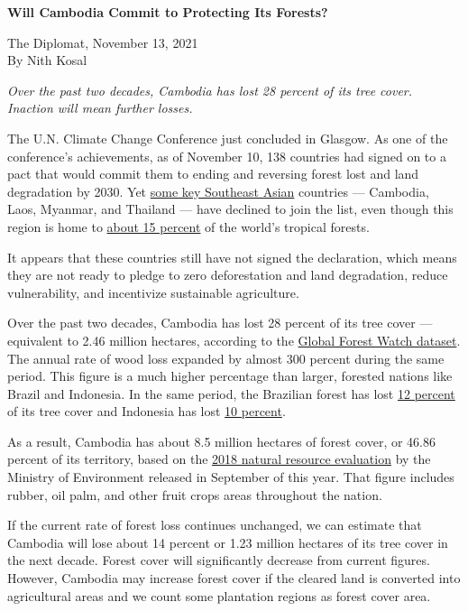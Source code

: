 \documentclass[10pt,a4paper]{letter}
\begin{document}
	
{\Large 
	\textbf{Will Cambodia Commit to Protecting Its Forests?}
} 

The Diplomat, November 13, 2021 \\
By Nith Kosal

\textit{Over the past two decades, Cambodia has lost 28 percent of its tree cover. Inaction will mean further losses. 
}

The U.N. Climate Change Conference just concluded in Glasgow. As one of the conference's achievements, as of November 10, 138 countries had signed on to a pact that would commit them to ending and reversing forest lost and land degradation by 2030. Yet \href{https://ukcop26.org/glasgow-leaders-declaration-on-forests-and-land-use/}{some key Southeast Asian} countries --- Cambodia, Laos, Myanmar, and Thailand --- have declined to join the list, even though this region is home to \href{https://bg.copernicus.org/articles/11/247/2014/bg-11-247-2014.pdf}{about 15 percent} of the world's tropical forests. 

It appears that these countries still have not signed the declaration, which means they are not ready to pledge to zero deforestation and land degradation, reduce vulnerability, and incentivize sustainable agriculture.

Over the past two decades, Cambodia has lost 28 percent of its tree cover --- equivalent to 2.46 million hectares, according to the \href{https://www.globalforestwatch.org/dashboards/country/KHM/}{Global Forest Watch dataset}. The annual rate of wood loss expanded by almost 300 percent during the same period. This figure is a much higher percentage than larger, forested nations like Brazil and Indonesia. In the same period, the Brazilian forest has lost \href{https://www.globalforestwatch.org/dashboards/country/BRA/}{12 percent} of its tree cover and Indonesia has lost \href{https://www.globalforestwatch.org/dashboards/country/IDN/}{10 percent}.  

As a result, Cambodia has about 8.5 million hectares of forest cover, or 46.86 percent of its territory, based on the \href{https://www.rfa.org/english/news/laos/deforestation-southeastasia-11052021155551.html}{2018 natural resource evaluation} by the Ministry of Environment released in September of this year. That figure includes rubber, oil palm, and other fruit crops areas throughout the nation. 

If the current rate of forest loss continues unchanged, we can estimate that Cambodia will lose about 14 percent or 1.23 million hectares of its tree cover in the next decade. Forest cover will significantly decrease from current figures. However, Cambodia may increase forest cover if the cleared land is converted into agricultural areas and we count some plantation regions as forest cover area.
\end{document}
